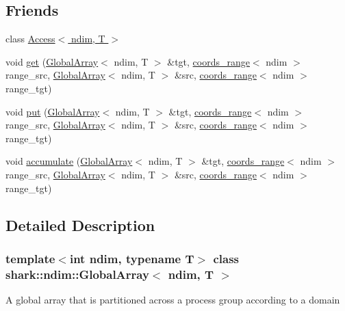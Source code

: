 \subsection*{Friends}
\begin{DoxyCompactItemize}
\item 
class \hyperlink{classshark_1_1ndim_1_1_global_array_aa496c51f4f4225904ad62cb63601e053}{Access$<$ ndim, T $>$}
\item 
void \hyperlink{classshark_1_1ndim_1_1_global_array_a2f0f1152d3993384631952178a21f82e}{get} (\hyperlink{classshark_1_1ndim_1_1_global_array}{Global\+Array}$<$ ndim, T $>$ \&tgt, \hyperlink{structshark_1_1ndim_1_1coords__range}{coords\+\_\+range}$<$ ndim $>$ range\+\_\+src, \hyperlink{classshark_1_1ndim_1_1_global_array}{Global\+Array}$<$ ndim, T $>$ \&src, \hyperlink{structshark_1_1ndim_1_1coords__range}{coords\+\_\+range}$<$ ndim $>$ range\+\_\+tgt)
\item 
void \hyperlink{classshark_1_1ndim_1_1_global_array_ad96ea2c2b281921d915e7a8834420f06}{put} (\hyperlink{classshark_1_1ndim_1_1_global_array}{Global\+Array}$<$ ndim, T $>$ \&tgt, \hyperlink{structshark_1_1ndim_1_1coords__range}{coords\+\_\+range}$<$ ndim $>$ range\+\_\+src, \hyperlink{classshark_1_1ndim_1_1_global_array}{Global\+Array}$<$ ndim, T $>$ \&src, \hyperlink{structshark_1_1ndim_1_1coords__range}{coords\+\_\+range}$<$ ndim $>$ range\+\_\+tgt)
\item 
void \hyperlink{classshark_1_1ndim_1_1_global_array_aa95eda1df3e42435fbeddc71a7bebeb9}{accumulate} (\hyperlink{classshark_1_1ndim_1_1_global_array}{Global\+Array}$<$ ndim, T $>$ \&tgt, \hyperlink{structshark_1_1ndim_1_1coords__range}{coords\+\_\+range}$<$ ndim $>$ range\+\_\+src, \hyperlink{classshark_1_1ndim_1_1_global_array}{Global\+Array}$<$ ndim, T $>$ \&src, \hyperlink{structshark_1_1ndim_1_1coords__range}{coords\+\_\+range}$<$ ndim $>$ range\+\_\+tgt)
\end{DoxyCompactItemize}


\subsection{Detailed Description}
\subsubsection*{template$<$int ndim, typename T$>$\newline
class shark\+::ndim\+::\+Global\+Array$<$ ndim, T $>$}

A global array that is partitioned across a process group according to a domain 

